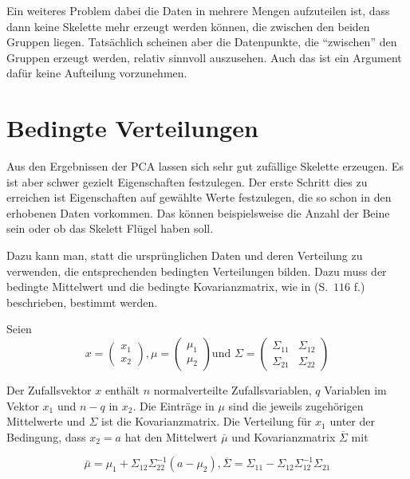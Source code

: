 Ein weiteres Problem dabei die Daten in mehrere Mengen aufzuteilen ist, dass dann keine Skelette mehr erzeugt werden können, die zwischen den beiden Gruppen liegen. Tatsächlich scheinen aber die Datenpunkte, die "`zwischen"' den Gruppen erzeugt werden, relativ sinnvoll auszusehen.
 Auch das ist ein Argument dafür keine Aufteilung vorzunehmen.
 
 
 \section{Bedingte Verteilungen}
 \label{pca_conditions}
 
 
 Aus den Ergebnissen der PCA lassen sich sehr gut zufällige Skelette erzeugen. Es ist aber schwer gezielt Eigenschaften festzulegen.
 Der erste Schritt dies zu erreichen ist Eigenschaften auf gewählte Werte festzulegen, die so schon in den erhobenen Daten vorkommen. Das können beispielsweise die Anzahl der Beine sein oder ob das Skelett Flügel haben soll.
 
 Dazu kann man, statt die ursprünglichen Daten und deren Verteilung zu verwenden, die entsprechenden bedingten Verteilungen bilden. Dazu muss der bedingte Mittelwert und die bedingte Kovarianzmatrix, wie in \cite{conditionalDistribution} (S.\ $116$ f.) beschrieben, bestimmt werden.
 
 Seien 
 \[x = \begin{pmatrix} x_1 \\ x_2 \end{pmatrix}, 
  \mu = \begin{pmatrix} \mu_1 \\ \mu_2 \end{pmatrix} \text{und } 
  \Sigma = \begin{pmatrix} \Sigma_{11} & \Sigma_{12} \\ \Sigma_{21} & \Sigma_{22} \end{pmatrix} \] 
 
 Der Zufallsvektor $x$ enthält $n$ normalverteilte Zufallsvariablen, $q$ Variablen im Vektor $x_1$ und $n - q$ in $x_2$. Die Einträge in $\mu$ sind die jeweils zugehörigen Mittelwerte und $\Sigma$ ist die Kovarianzmatrix. Die Verteilung für $x_1$ unter der Bedingung, dass $x_2 = a$ hat den Mittelwert $\bar{\mu}$ und Kovarianzmatrix $\overline{\Sigma}$ mit
 
 \[ \bar{\mu} = \mu_1 + \Sigma_{12} \Sigma_{22}^{-1} (a - \mu_2), 
    \overline{\Sigma} = \Sigma_{11} - \Sigma_{12} \Sigma_{12}^{-1} \Sigma_{21} \]
 
